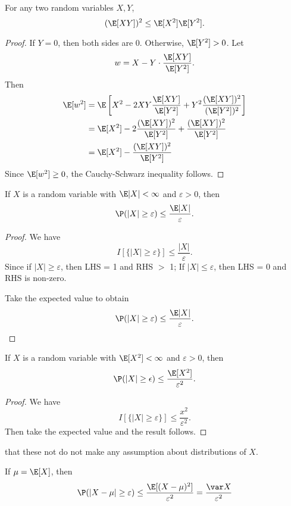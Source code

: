 \documentclass[a4paper]{article}
\begin{document}
\begin{thm}
  For any two random variables $X, Y$,
  \[
    (\E[XY])^2 \leq \E[X^2]\E[Y^2].
  \]
\end{thm}

\begin{proof}
  If $Y = 0$, then both sides are $0$. Otherwise, $\E[Y^2] > 0$. Let
  \[
    w = X - Y\cdot \frac{\E[XY]}{\E[Y^2]}.
  \]
  Then
  \begin{align*}
    \E[w^2] &= \E\left[X^2 - 2XY\frac{\E[XY]}{\E[Y^2]} + Y^2\frac{(\E[XY])^2}{(\E[Y^2])^2}\right]\\
    &= \E[X^2] - 2\frac{(\E[XY])^2}{\E[Y^2]} + \frac{(\E[XY])^2}{\E[Y^2]}\\
    &= \E[X^2] - \frac{(\E[XY])^2}{\E[Y^2]}
  \end{align*}
  Since $\E[w^2] \geq 0$, the Cauchy-Schwarz inequality follows.
\end{proof}

\begin{thm}
  If $X$ is a random variable with $\E|X| < \infty$ and $\varepsilon > 0$, then
  \[
    \P(|X| \geq \varepsilon) \leq \frac{\E|X|}{\varepsilon}.
  \]
\end{thm}

\begin{proof}
  We have
  \[
    I[\{|X|\geq \varepsilon\}] \leq \frac{|X|}{\varepsilon}.
  \]
  Since if $|X| \geq \varepsilon$, then LHS = 1 and RHS $>$ 1; If $|X| \leq \varepsilon$, then LHS = 0 and RHS is non-zero.
  
  Take the expected value to obtain
  \[
    \P(|X| \geq \varepsilon) \leq \frac{\E |X|}{\varepsilon}.
  \]
\end{proof}

\begin{thm}
  If $X$ is a random variable with $\E[X^2] < \infty$ and $\varepsilon > 0$, then
  \[
    \P(|X| \geq \epsilon) \leq \frac{\E[X^2]}{\varepsilon^2}.
  \]
\end{thm}

\begin{proof}
  We have
  \[
    I[\{|X|\geq \varepsilon\}] \leq \frac{x^2}{\varepsilon^2}.
  \]
  Then take the expected value and the result follows.
\end{proof}
\note that these not do not make any assumption about distributions of $X$.

\note If $\mu = \E[X]$, then
\[
  \P(|X - \mu| \geq \varepsilon) \leq \frac{\E[(X - \mu)^2]}{\varepsilon^2} = \frac{\var X}{\varepsilon^2}
\]
\end{document}
